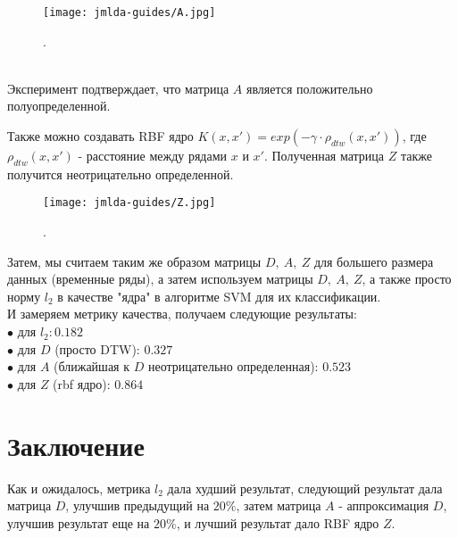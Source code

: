 \documentclass[12pt, twoside]{article}
\begin{document}
\begin{figure}[H]
\centering
\begin{minipage}{0.66\textwidth}
\texttt{[image: jmlda-guides/A.jpg]}
\end{minipage}%
\caption{ . }
\label{fig:2}
\end{figure}

\\
{Эксперимент подтверждает, что матрица $A$ является положительно полуопределенной.}

{Также можно создавать RBF ядро $K(x, x') = exp(-\gamma \cdot \rho_{dtw}(x, x'))$, где $\rho_{dtw}(x, x')$ - расстояние между рядами $x$ и $x'$. Полученная матрица $Z$ также получится неотрицательно определенной.}\\

\begin{figure}[H]
\centering
\begin{minipage}{0.66\textwidth}
\texttt{[image: jmlda-guides/Z.jpg]}
\end{minipage}%
\caption{ .}
\label{fig:2}
\end{figure}

{Затем, мы считаем таким же образом матрицы $D, \ A, \ Z$ для большего размера данных (временные ряды), а затем используем матрицы $D, \ A, \ Z$, а также просто норму $l_2$ в качестве "ядра"  в алгоритме SVM для их классификации.}\\
{И замеряем метрику качества, получаем следующие результаты:}\\
{$\bullet$ для $l_2: 0.182$}\\
{$\bullet$ для $D$ (просто DTW): $0.327$}\\
{$\bullet$ для $A$ (ближайшая к $D$ неотрицательно определенная): $0.523$}\\
{$\bullet$ для $Z$ (rbf ядро): $0.864$}\\



\section{Заключение}
Как и ожидалось, метрика $l_2$ дала худший результат, следующий результат дала матрица $D$, улучшив предыдущий на $20 \%$, затем матрица $A$ - аппроксимация $D$, улучшив результат еще на $20 \%$, и лучший результат дало RBF ядро $Z$.





\end{document}
